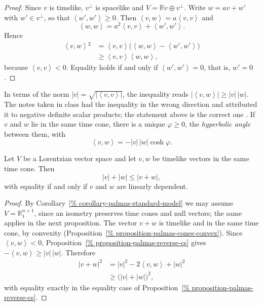 \begin{proof}
Since $v$ is timelike, $v^{\perp}$ is
spacelike and $V=\mathbb{R}v\oplus
v^{\perp}$. Write $w=av+w'$ with
$w'\in v^{\perp}$, so that
$\left\langle{} w',w' \right\rangle{}\geq 0$.
Then
$\left\langle{} v,w \right\rangle{}
=a\left\langle{} v,v \right\rangle{}$
and
$$
\left\langle{} w,w \right\rangle{}
=a^2\left\langle{} v,v \right\rangle{}
+\left\langle{} w',w' \right\rangle{}.
$$
Hence
$$
\begin{aligned}
\left\langle{} v,w \right\rangle{}^2
&=\left\langle{} v,v \right\rangle{}
\big(\left\langle{} w,w \right\rangle{}
-\left\langle{} w',w' \right\rangle{}\big)\\
&\geq\left\langle{} v,v \right\rangle{}
\left\langle{} w,w \right\rangle{},
\end{aligned}
$$
because
$\left\langle{} v,v \right\rangle{}<0$.
Equality holds if and only if
$\left\langle{} w',w' \right\rangle{}=0$,
that is, $w'=0$.
\end{proof}

In terms of the norm
$|v|=\sqrt{|\left\langle{} v,v
\right\rangle{}|}$, the inequality reads
$|\left\langle{} v,w \right\rangle{}|\geq
|v|\,|w|$. The notes taken in class had the
inequality in the wrong direction and
attributed it to negative definite scalar
products; the statement above is the
correct one \cite[Theorem
1.1]{lopez2014differential}. If $v$ and
$w$ lie in the same time cone, there is a
unique $\varphi\geq 0$, the
\emph{hyperbolic angle} between them, with
$$
\left\langle{} v,w \right\rangle{}
=-|v|\,|w|\cosh\varphi .
$$

\begin{proposition}
\label{proposition-palmas-reverse-triangle}
Let $V$ be a Lorentzian vector space and
let $v,w$ be timelike vectors in the same
time cone. Then
$$
|v|+|w|\leq |v+w|,
$$
with equality if and only if $v$ and $w$
are linearly dependent.
\end{proposition}

\begin{proof}
By Corollary~\ref{%
corollary-palmas-standard-model} we may
assume $V=\mathbb{R}^{n+1}_1$, since an
isometry preserves time cones and null
vectors; the same applies in the next
proposition.
The vector $v+w$ is timelike and in the
same time cone, by convexity
(Proposition~\ref{%
proposition-palmas-cones-convex}).
Since
$\left\langle{} v,w \right\rangle{}<0$,
Proposition~\ref{%
proposition-palmas-reverse-cs}
gives
$-\left\langle{} v,w \right\rangle{}
\geq |v|\,|w|$. Therefore
$$
\begin{aligned}
|v+w|^2
&=|v|^2-2\left\langle{} v,w
\right\rangle{}+|w|^2\\
&\geq\big(|v|+|w|\big)^2,
\end{aligned}
$$
with equality exactly in the equality case
of Proposition~\ref{%
proposition-palmas-reverse-cs}.
\end{proof}

